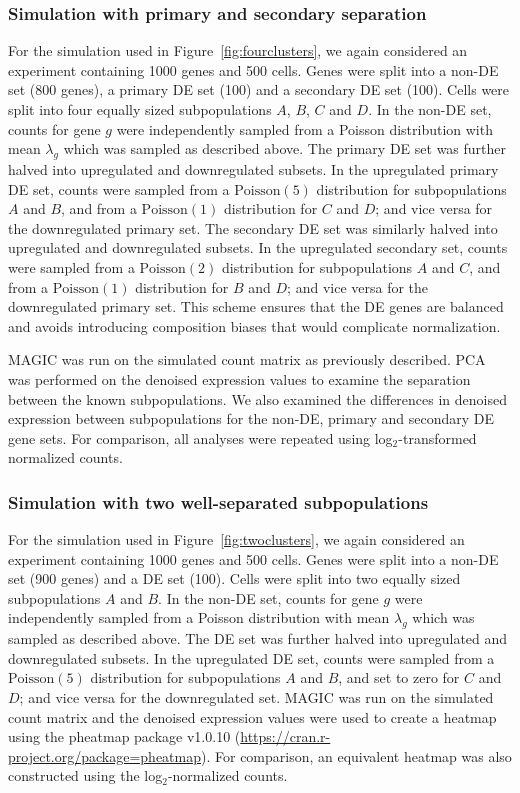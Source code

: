\documentclass[10pt,letterpaper]{article}
\begin{document}
\subsubsection*{Simulation with primary and secondary separation}
For the simulation used in Figure~\ref{fig:fourclusters}, we again considered an experiment containing 1000 genes and 500 cells.
Genes were split into a non-DE set (800 genes), a primary DE set (100) and a secondary DE set (100).
Cells were split into four equally sized subpopulations $A$, $B$, $C$ and $D$.
In the non-DE set, counts for gene $g$ were independently sampled from a Poisson distribution with mean $\lambda_{g}$ which was sampled as described above.
The primary DE set was further halved into upregulated and downregulated subsets.
In the upregulated primary DE set, counts were sampled from a $\mbox{Poisson}(5)$ distribution for subpopulations $A$ and $B$, 
and from a $\mbox{Poisson}(1)$ distribution for $C$ and $D$; and vice versa for the downregulated primary set.
The secondary DE set was similarly halved into upregulated and downregulated subsets.
In the upregulated secondary set, counts were sampled from a $\mbox{Poisson}(2)$ distribution for subpopulations $A$ and $C$, 
and from a $\mbox{Poisson}(1)$ distribution for $B$ and $D$; and vice versa for the downregulated primary set.
This scheme ensures that the DE genes are balanced and avoids introducing composition biases \cite{robinson2010scaling} that would complicate normalization.

MAGIC was run on the simulated count matrix as previously described.
PCA was performed on the denoised expression values to examine the separation between the known subpopulations.
We also examined the differences in denoised expression between subpopulations for the non-DE, primary and secondary DE gene sets.
For comparison, all analyses were repeated using log$_2$-transformed normalized counts.

\subsubsection*{Simulation with two well-separated subpopulations}
For the simulation used in Figure~\ref{fig:twoclusters}, we again considered an experiment containing 1000 genes and 500 cells.
Genes were split into a non-DE set (900 genes) and a DE set (100).
Cells were split into two equally sized subpopulations $A$ and $B$.
In the non-DE set, counts for gene $g$ were independently sampled from a Poisson distribution with mean $\lambda_{g}$ which was sampled as described above.
The DE set was further halved into upregulated and downregulated subsets.
In the upregulated DE set, counts were sampled from a $\mbox{Poisson}(5)$ distribution for subpopulations $A$ and $B$, and set to zero for $C$ and $D$;
and vice versa for the downregulated set.
MAGIC was run on the simulated count matrix and the denoised expression values were used to create a heatmap using the pheatmap package v1.0.10 (\url{https://cran.r-project.org/package=pheatmap}).
For comparison, an equivalent heatmap was also constructed using the log$_2$-normalized counts.
\end{document}
